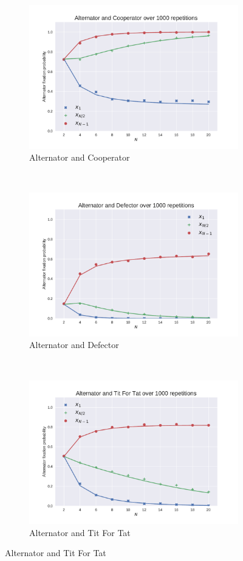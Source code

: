 \documentclass{article}
\begin{document}
\begin{figure}[!hbtp]
    \centering
    \begin{subfigure}[t]{.3\textwidth}
        \centering
        \includegraphics[width=.8\textwidth]{../img/Alternator_v_Cooperator.pdf}
        \caption{Alternator and Cooperator}
    \end{subfigure}%
    ~
    \begin{subfigure}[t]{.3\textwidth}
        \centering
        \includegraphics[width=.8\textwidth]{../img/Alternator_v_Defector.pdf}
        \caption{Alternator and Defector}
    \end{subfigure}%
    ~
    \begin{subfigure}[t]{.3\textwidth}
        \centering
        \includegraphics[width=.8\textwidth]{../img/Alternator_v_Tit_For_Tat.pdf}
        \caption{Alternator and Tit For Tat}
    \end{subfigure}%


\end{figure}
\end{document}
